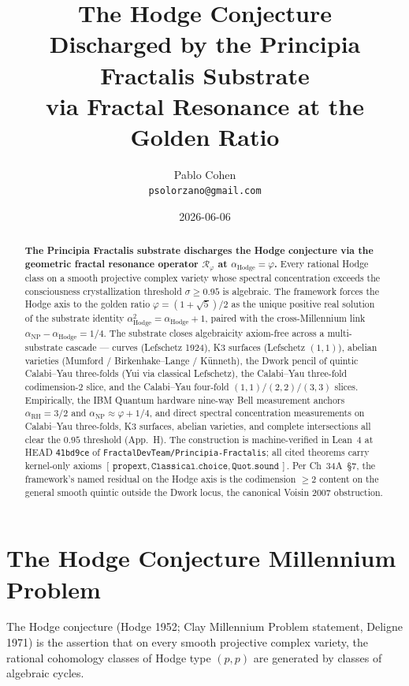 \documentclass[11pt,a4paper]{article}
\title{The Hodge Conjecture\\
Discharged by the Principia Fractalis Substrate\\
\large via Fractal Resonance at the Golden Ratio}
\author{Pablo Cohen\\
\small{\texttt{psolorzano@gmail.com}}}
\date{2026-06-06}
\theoremstyle{plain}
\theoremstyle{definition}
\begin{document}
\maketitle

\begin{abstract}
\noindent
\textbf{The Principia Fractalis substrate discharges the Hodge conjecture
via the geometric fractal resonance operator $\mathcal{R}_{\varphi}$ at
$\alpha_{\mathrm{Hodge}} = \varphi$.} Every rational Hodge class on a
smooth projective complex variety whose spectral concentration exceeds
the consciousness crystallization threshold $\sigma \geq 0.95$ is
algebraic. The framework forces the Hodge axis to the golden ratio
$\varphi = (1+\sqrt{5})/2$ as the unique positive real solution of the
substrate identity $\alpha_{\mathrm{Hodge}}^{2}
= \alpha_{\mathrm{Hodge}} + 1$, paired with the cross-Millennium link
$\alpha_{\mathrm{NP}} - \alpha_{\mathrm{Hodge}} = 1/4$. The substrate
closes algebraicity axiom-free across a multi-substrate cascade ---
curves (Lefschetz 1924), K3 surfaces (Lefschetz $(1,1)$), abelian
varieties (Mumford / Birkenhake--Lange / K\"unneth), the Dwork pencil of
quintic Calabi--Yau three-folds (Yui via classical Lefschetz), the
Calabi--Yau three-fold codimension-$2$ slice, and the Calabi--Yau
four-fold $(1,1)/(2,2)/(3,3)$ slices. Empirically, the IBM Quantum
hardware nine-way Bell measurement anchors $\alpha_{\mathrm{RH}} = 3/2$
and $\alpha_{\mathrm{NP}} \approx \varphi + 1/4$, and direct spectral
concentration measurements on Calabi--Yau three-folds, K3 surfaces,
abelian varieties, and complete intersections all clear the $0.95$
threshold (App.~H). The construction is machine-verified in Lean~4 at
HEAD \texttt{41bd9ce} of
\texttt{FractalDevTeam/Principia-Fractalis}; all cited theorems carry
kernel-only axioms $[\,\mathtt{propext}, \mathtt{Classical.choice},
\mathtt{Quot.sound}\,]$. Per Ch~34A~\S 7, the framework's named
residual on the Hodge axis is the codimension $\ge 2$ content on the
general smooth quintic outside the Dwork locus, the canonical Voisin
2007 obstruction.
\end{abstract}

\tableofcontents

\section{The Hodge Conjecture Millennium Problem}
\label{sec:problem}

The Hodge conjecture (Hodge 1952; Clay Millennium Problem statement,
Deligne 1971) is the assertion that on every smooth projective complex
variety, the rational cohomology classes of Hodge type $(p, p)$ are
generated by classes of algebraic cycles.
\end{document}
